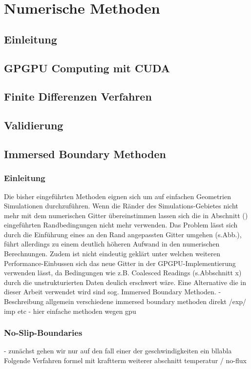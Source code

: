 \chapter{Numerische Methoden}
\section{Einleitung}
\section{GPGPU Computing mit CUDA}
\section{Finite Differenzen Verfahren}
\section{Validierung}
\section{Immersed Boundary Methoden}

\newpage

\subsection{Einleitung}
Die bisher eingeführten Methoden eignen sich um auf einfachen Geometrien Simulationen durchzuführen.
Wenn die Ränder des Simulations-Gebietes nicht mehr mit dem numerischen Gitter übereinstimmen lassen sich die in Abschnitt () eingeführten Randbedingungen nicht mehr verwenden.
Das Problem lässt sich durch die Einführung eines an den Rand angepassten Gitter umgehen (s.Abb.), führt allerdings zu einem deutlich höheren Aufwand in den numerischen Berechnungen.
Zudem ist nicht eindeutig geklärt  unter welchen weiteren Performance-Einbussen sich das neue Gitter in der GPGPU-Implementierung verwenden lässt, da Bedingungen wie
z.B. Coalesced Readings  (s.Abbschnitt x) durch die unstrukturierten Daten deulich erschwert wäre.
Eine Alternative die in dieser Arbeit verwendet wird sind  sog. Immersed Boundary Methoden.
- Beschreibung allgemein verschiedene immersed boundary methoden direkt /exp/ imp etc
- hier einfache methoden wegen gpu



\subsection{No-Slip-Boundaries}
- zunächst gehen wir nur auf den fall einer der geschwindigkeiten ein bllabla
Folgende Verfahren formel mit kraftterm
weiterer abschnitt temperatur / no-flux

